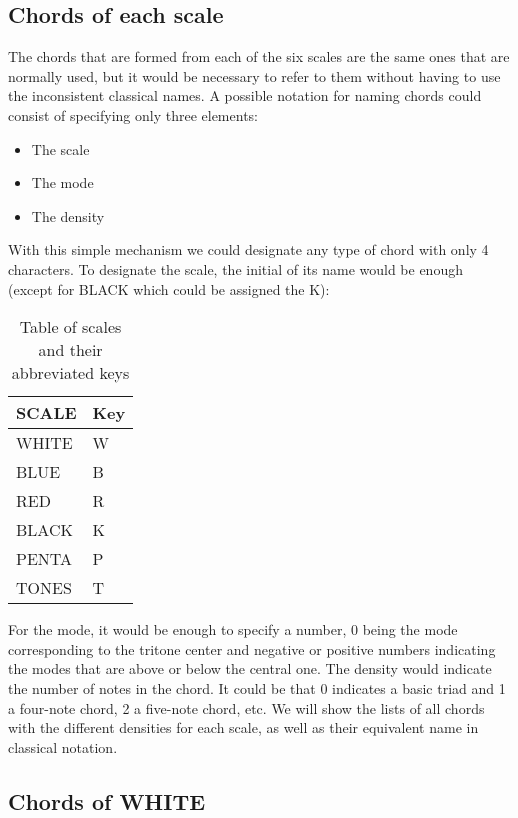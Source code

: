 \documentclass[]{report}
\begin{document}
\subsection{Chords of each scale}
The chords that are formed from each of the six scales are the same ones that are normally used, but it would be necessary to refer to them without having to use the inconsistent classical names.
A possible notation for naming chords could consist of specifying only three elements:
\begin{itemize}
\item The scale
\item The mode
\item The density
\end{itemize}
With this simple mechanism we could designate any type of chord with only 4 characters.
To designate the scale, the initial of its name would be enough (except for \textsf{BLACK} which could be assigned the \textsf{K}):
\begin{table}[H]
\centering
\begin{tabular}{ll}
\toprule
SCALE & Key \\
\midrule
\textsf{WHITE} & W \\
\textsf{BLUE} & B \\
\textsf{RED} & R \\
\textsf{BLACK} & K \\
\textsf{PENTA} & P \\
\textsf{TONES} & T \\
\bottomrule
\end{tabular}
\caption{Table of scales and their abbreviated keys}\label{tab:scales-and-keys}
\end{table}
For the mode, it would be enough to specify a number, 0 being the mode corresponding to the tritone center and negative or positive numbers indicating the modes that are above or below the central one.
The density would indicate the number of notes in the chord. It could be that 0 indicates a basic triad and 1 a four-note chord, 2 a five-note chord, etc.
We will show the lists of all chords with the different densities for each scale, as well as their equivalent name in classical notation.
\subsection*{Chords of WHITE}
\end{document}
